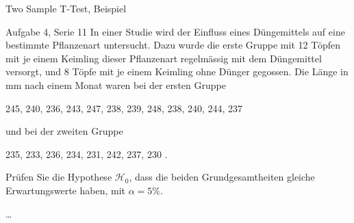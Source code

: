 \documentclass[handout]{beamer}
\begin{document}
\begin{frame}{Two Sample T-Test, Beispiel}
\begin{beamerboxesrounded}[shadow]{Aufgabe 4, Serie 11}
In einer Studie wird der Einfluss eines Düngemittels auf eine bestimmte Pflanzenart 
untersucht. Dazu wurde die erste Gruppe mit 12 Töpfen mit je einem Keimling dieser 
Pflanzenart regelmässig mit dem Düngemittel versorgt, und 8 Töpfe mit je einem Keimling
ohne Dünger gegossen. Die Länge in mm nach einem Monat waren bei der ersten Gruppe
\begin{center}
245, 240, 236, 243, 247, 238, 239, 248, 238, 240, 244, 237
\end{center}
und bei der zweiten Gruppe
\begin{center}
235, 233, 236, 234, 231, 242, 237, 230 .
\end{center}

\begin{outline}
\item Prüfen Sie die Hypothese $\mathcal{H}_0$, dass die beiden Grundgesamtheiten gleiche
Erwartungswerte haben, mit $\alpha = 5\%$.
\item [\dots]
\end{outline}
\end{beamerboxesrounded}
\end{frame}
\end{document}

